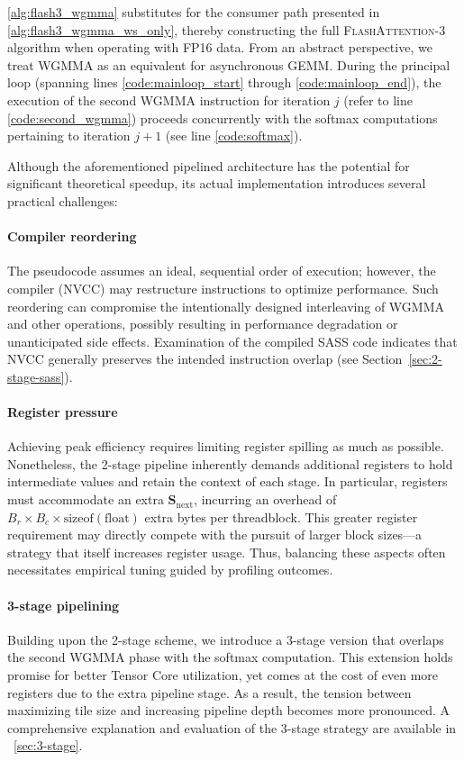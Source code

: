   \cref{alg:flash3_wgmma} substitutes for the consumer path presented in \cref{alg:flash3_wgmma_ws_only}, thereby constructing the full \textsc{FlashAttention-3} algorithm when operating with FP16 data. From an abstract perspective, we treat WGMMA as an equivalent for asynchronous GEMM. During the principal loop (spanning lines \ref{code:mainloop_start} through \ref{code:mainloop_end}), the execution of the second WGMMA instruction for iteration $j$ (refer to line \ref{code:second_wgmma}) proceeds concurrently with the softmax computations pertaining to iteration $j+1$ (see line \ref{code:softmax}).

Although the aforementioned pipelined architecture has the potential for significant theoretical speedup, its actual implementation introduces several practical challenges:
\paragraph{Compiler reordering} The pseudocode assumes an ideal, sequential order of execution; however, the compiler (NVCC) may restructure instructions to optimize performance. Such reordering can compromise the intentionally designed interleaving of WGMMA and other operations, possibly resulting in performance degradation or unanticipated side effects. Examination of the compiled SASS code indicates that NVCC generally preserves the intended instruction overlap (see Section~\ref{sec:2-stage-sass}).
\paragraph{Register pressure} Achieving peak efficiency requires limiting register spilling as much as possible. Nonetheless, the 2-stage pipeline inherently demands additional registers to hold intermediate values and retain the context of each stage. In particular, registers must accommodate an extra $\mathbf{S}_{\mathrm{next}}$, incurring an overhead of $B_r \times B_c \times \text{sizeof}(\text{float})$ extra bytes per threadblock. This greater register requirement may directly compete with the pursuit of larger block sizes—a strategy that itself increases register usage. Thus, balancing these aspects often necessitates empirical tuning guided by profiling outcomes.
\paragraph{3-stage pipelining} Building upon the 2-stage scheme, we introduce a 3-stage version that overlaps the second WGMMA phase with the softmax computation. This extension holds promise for better Tensor Core utilization, yet comes at the cost of even more registers due to the extra pipeline stage. As a result, the tension between maximizing tile size and increasing pipeline depth becomes more pronounced. A comprehensive explanation and evaluation of the 3-stage strategy are available in ~\cref{sec:3-stage}.

